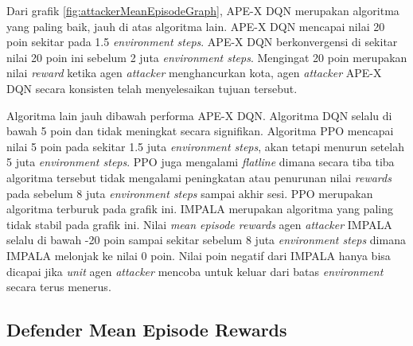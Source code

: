 Dari grafik \ref{fig:attackerMeanEpisodeGraph}, APE-X DQN merupakan algoritma yang paling baik,
jauh di atas algoritma lain. APE-X DQN mencapai nilai 20 poin sekitar pada 1.5 \emph{environment steps}.
APE-X DQN berkonvergensi di sekitar nilai 20 poin ini sebelum 2 juta \emph{environment steps}.
Mengingat 20 poin merupakan nilai \emph{reward} ketika agen \emph{attacker} menghancurkan kota,
agen \emph{attacker} APE-X DQN secara konsisten telah menyelesaikan tujuan tersebut.

Algoritma lain jauh dibawah performa APE-X DQN. Algoritma DQN selalu di bawah 5 poin dan tidak meningkat secara signifikan.
Algoritma PPO mencapai nilai 5 poin pada sekitar 1.5 juta \emph{environment steps}, akan tetapi menurun setelah 5 juta
\emph{environment steps}. PPO juga mengalami \emph{flatline} dimana secara tiba tiba algoritma tersebut
tidak mengalami peningkatan atau penurunan nilai \emph{rewards} pada sebelum 8 juta \emph{environment steps}
sampai akhir sesi. PPO merupakan algoritma terburuk pada grafik ini. IMPALA merupakan algoritma yang paling tidak stabil pada grafik ini.
Nilai \emph{mean episode rewards} agen \emph{attacker} IMPALA selalu di bawah -20 poin sampai
sekitar sebelum 8 juta \emph{environment steps} dimana IMPALA melonjak ke nilai 0 poin.
Nilai poin negatif dari IMPALA hanya bisa dicapai jika \emph{unit} agen \emph{attacker} mencoba untuk keluar
dari batas \emph{environment} secara terus menerus.

\subsection{Defender Mean Episode Rewards}

